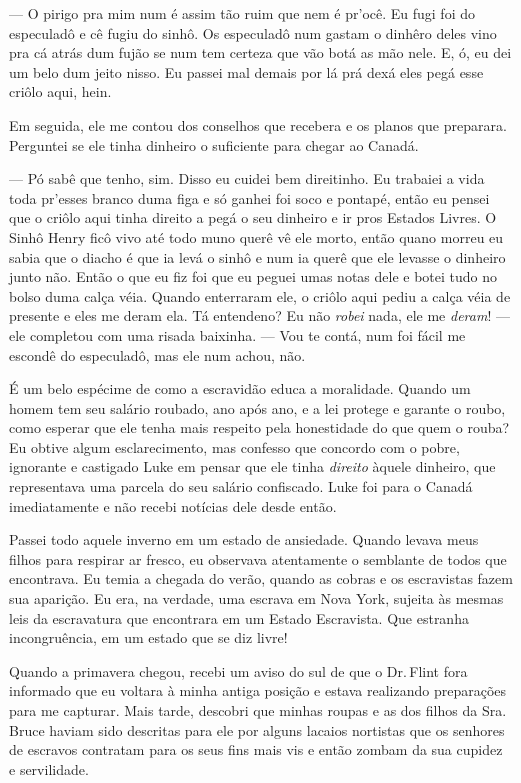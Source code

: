 --- O pirigo pra mim num é assim tão
ruim que nem é pr'ocê. Eu fugi foi do especuladô e cê fugiu do sinhô. Os
especuladô num gastam o dinhêro deles vino pra cá atrás dum fujão se num
tem certeza que vão botá as mão nele. E, ó, eu dei um belo dum jeito
nisso. Eu passei mal demais por lá prá dexá eles pegá esse criôlo aqui,
hein.

Em seguida, ele me contou dos conselhos
que recebera e os planos que preparara. Perguntei se ele tinha dinheiro
o suficiente para chegar ao Canadá.

--- Pó sabê que tenho, sim. Disso eu cuidei bem direitinho. Eu trabaiei
a vida toda pr'esses branco duma figa e só ganhei foi soco e pontapé,
então eu pensei que o criôlo aqui tinha direito a pegá o seu dinheiro e
ir pros Estados Livres. O Sinhô Henry ficô vivo até todo muno querê vê
ele morto, então quano morreu eu sabia que o diacho é que ia levá o
sinhô e num ia querê que ele levasse o dinheiro junto não. Então o que
eu fiz foi que eu peguei umas notas dele e botei tudo no bolso duma
calça véia. Quando enterraram ele, o criôlo aqui pediu a calça véia de
presente e eles me deram ela. Tá entendeno? Eu não \emph{robei} nada,
ele me \emph{deram}! --- ele completou com uma risada baixinha. --- Vou
te contá, num foi fácil me escondê do especuladô, mas ele num achou,
não.

É um belo espécime de como a escravidão
educa a moralidade. Quando um homem tem seu salário roubado, ano após
ano, e a lei protege e garante o roubo, como esperar que ele tenha mais
respeito pela honestidade do que quem o rouba? Eu obtive algum
esclarecimento, mas confesso que concordo com o pobre, ignorante e
castigado Luke em pensar que ele tinha \emph{direito} àquele dinheiro,
que representava uma parcela do seu salário confiscado. Luke foi para o
Canadá imediatamente e não recebi notícias dele desde então.

Passei todo aquele inverno em um estado
de ansiedade. Quando levava meus filhos para respirar ar fresco, eu
observava atentamente o semblante de todos que encontrava. Eu temia a
chegada do verão, quando as cobras e os escravistas fazem sua aparição.
Eu era, na verdade, uma escrava em
Nova York, sujeita às mesmas leis da escravatura que encontrara em um
Estado Escravista. Que estranha incongruência, em um estado que se diz
livre!

Quando a primavera chegou, recebi um
aviso do sul de que o Dr.\,Flint fora informado que eu voltara à minha
antiga posição e estava realizando preparações para me capturar. Mais
tarde, descobri que minhas roupas e as dos filhos da Sra.\,Bruce haviam
sido descritas para ele por alguns lacaios nortistas que os senhores de
escravos contratam para os seus fins mais vis e então zombam da sua
cupidez e servilidade.

